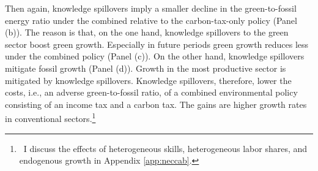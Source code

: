 Then again, knowledge spillovers imply a smaller decline in the green-to-fossil energy ratio under the combined relative to the carbon-tax-only policy (Panel (b)). The reason is that, on the one hand, knowledge spillovers to the green sector boost green growth. Especially in future periods green growth reduces less under the combined policy (Panel (c)). On the other hand, knowledge spillovers mitigate fossil growth (Panel (d)).  Growth in the most productive sector is mitigated by knowledge spillovers. %
 Knowledge spillovers, therefore, lower the costs, i.e., an adverse green-to-fossil ratio, of a combined environmental policy consisting of an income tax and a carbon tax. The gains are higher growth rates in conventional sectors.\footnote{\ 
 	I discuss the effects of heterogeneous skills, heterogeneous labor shares, and endogenous growth in Appendix \ref{app:neccab}. }
 
